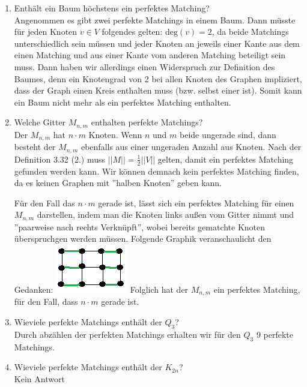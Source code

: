 \begin{enumerate}[label=(\alph*)]
        \item Enthält ein Baum höchstens ein perfektes Matching? \\
        Angenommen es gibt zwei perfekte Matchings in einem Baum. Dann müsste für jeden Knoten $v \in 
        V$ folgendes gelten: $\textrm{deg}(v) = 2$, da beide Matchings unterschiedlich sein müssen und 
        jeder Knoten an jeweils einer Kante aus dem einen Matching und aus einer Kante vom anderen 
        Matching beteiligt sein muss. Dann haben wir allerdings einen Widerspruch zur Definition des 
        Baumes, denn ein Knotengrad von 2 bei allen Knoten des Graphen impliziert, dass der Graph einen 
        Kreis enthalten muss (bzw. selbst einer ist). Somit kann ein Baum nicht mehr als ein perfektes 
        Matching enthalten. 
        
        \item Welche Gitter $M_{n,m}$ enthalten perfekte Matchings? \\
        Der $M_{n,m}$ hat $n \cdot m$ Knoten. Wenn $n$ und $m$ beide ungerade sind, dann besteht der 
        $M_{n,m}$ ebenfalls aus einer ungeraden Anzahl aus Knoten. Nach der Definition 3.32 (2.) muss 
        $||M|| = \frac{1}{2} ||V||$ gelten, damit ein perfektes Matching gefunden werden kann. Wir 
        können demnach kein perfektes Matching finden, da es keinen Graphen mit ''halben Knoten'' geben 
        kann. \par
        Für den Fall das $n \cdot m$ gerade ist, lässt sich ein perfektes Matching für einen $M_{n,m}$ 
        darstellen, indem man die Knoten links außen vom Gitter nimmt und ''paarweise nach rechts 
        Verknüpft'', wobei bereits gematchte Knoten überspruchgen werden müssen. Folgende Graphik 
        veranschaulicht den Gedanken:
        \includegraphics{task_h}
        Folglich hat der $M_{n,m}$ ein perfektes Matching, für den Fall, dass $n \cdot m$ gerade ist.
        
        \item Wieviele perfekte Matchings enthält der $Q_3$? \\
        Durch abzählen der perfekten Matchings erhalten wir für den $Q_3$ 9 perfekte Matchings.
        
        \item Wieviele perfekte Matchings enthält der $K_{2n}$?\\
        Kein Antwort
        
    \end{enumerate}
    
